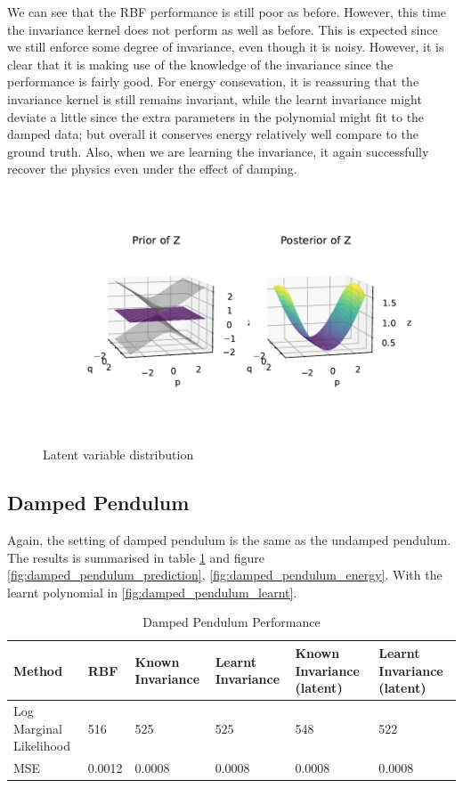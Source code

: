 \documentclass{statsmsc}
\begin{document}
We can see that the RBF performance is still poor as before.
However, this time the invariance kernel does not perform as well as before. 
This is expected since we still enforce some degree of invariance, even though it is noisy. 
However, it is clear that it is making use of the knowledge of the invariance since the performance is fairly good.
For energy consevation, it is reassuring that the invariance kernel is still remains invariant, while the learnt invariance might deviate a little since the extra parameters in the polynomial might fit to the damped data; but overall it conserves energy relatively well compare to the ground truth.
Also, when we are learning the invariance, it again successfully recover the physics even under the effect of damping.

\begin{figure}[H] 
  \includegraphics[width=0.8\linewidth]{../codes/figures/latent_damped_shm.pdf}
  \centering
  \caption{Latent variable distribution}
  \label{fig:latent_damped_shm}
\end{figure}



\subsection{Damped Pendulum}
Again, the setting of damped pendulum is the same as the undamped pendulum.
The results is summarised in table \ref{tab:damped_pendulum_performance} and figure \ref{fig:damped_pendulum_prediction}, \ref{fig:damped_pendulum_energy}.
With the learnt polynomial in \ref{fig:damped_pendulum_learnt}.

\begin{table}[H]
  \centering
  \begin{tabular}{l l l l l l}
    \hline
Method           & RBF & Known Invariance&  Learnt Invariance & Known Invariance (latent) & Learnt Invariance (latent)\\
  \hline
Log Marginal Likelihood & 516 & 525 & 525 & 548 & 522 \\
MSE & 0.0012 & 0.0008 & 0.0008 & 0.0008 & 0.0008 \\

    \hline
  \end{tabular}
  \caption{Damped Pendulum Performance}
  \label{tab:damped_pendulum_performance}
\end{table}
\end{document}
